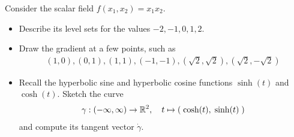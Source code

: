 \documentclass[11pt]{article}
\begin{document}
\begin{exercise}
    Consider the scalar field $f(x_1,x_2) = x_1 x_2$. 
    \begin{itemize}
     \item Describe its level sets for the values $-2, -1, 0, 1, 2$.
     \item Draw the gradient at a few points, such as 
     \begin{align}
        \left( 1,0 \right), \left( 0,1 \right), \left( 1,1 \right), \left( -1,-1 \right), \left( \sqrt{2},\sqrt{2} \right), \left( \sqrt{2},-\sqrt{2} \right)
     \end{align}
     \item 
     Recall the hyperbolic sine and hyperbolic cosine functions $\sinh(t)$ and $\cosh(t)$. 
     Sketch the curve 
     \begin{align}
        \gamma : (-\infty,\infty) \rightarrow \mathbb{R}^{2}, \quad t \mapsto \left( \; \cosh(t), \; \sinh(t) \; \right)
     \end{align}
     and compute its tangent vector $\dot \gamma$.
    \end{itemize}
\end{exercise}
\end{document}
